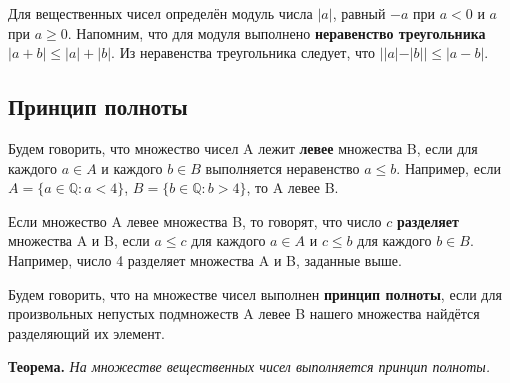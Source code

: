 \documentclass[12pt]{article}
\theoremstyle{definition}
\begin{document}
Для вещественных чисел определён модуль числа $|a|$, равный $-a$ при $a < 0$ и $a$ при $a \geq 0$. Напомним, что для модуля выполнено \textbf{неравенство треугольника} $|a+b| \leq |a|+|b|$. Из неравенства треугольника следует, что $||a|-|b|| \leq |a-b|$.

\subsection*{Принцип полноты}
Будем говорить, что множество чисел A лежит \textbf{левее} множества B, если для каждого $a \in A$ и каждого $b \in B$ выполняется неравенство $a \leq b$. Например, если $A=\{a \in \mathbb{Q}:a<4\}$, $B=\{b \in \mathbb{Q}:b>4\}$, то A левее B.

Если множество A левее множества B, то говорят, что число $c$ \textbf{разделяет} множества A и B, если $a \leq c$ для каждого $a \in A$ и $c \leq b$ для каждого $b \in B$. Например, число 4 разделяет множества A и B, заданные выше.

Будем говорить, что на множестве чисел выполнен \textbf{принцип полноты}, если для произвольных непустых подмножеств A левее B нашего множества найдётся разделяющий их элемент.


\textbf{Теорема.} \textit{На множестве вещественных чисел выполняется принцип полноты.}
\end{document}
